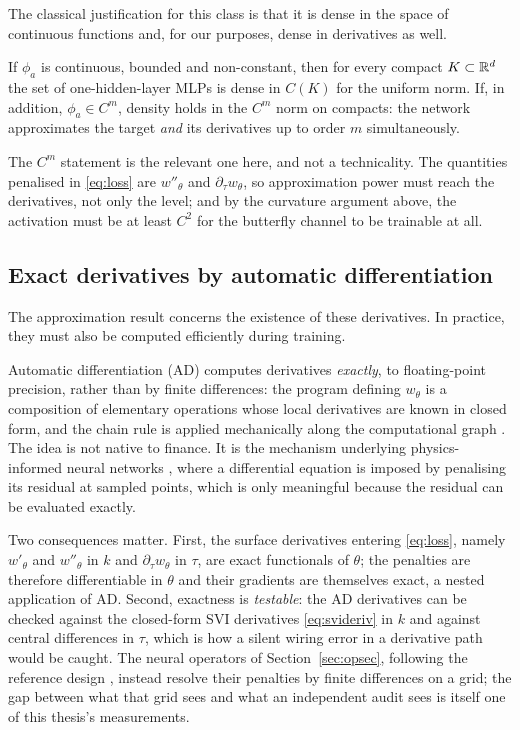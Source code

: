 The classical justification for this class is that it is dense in the space of continuous
functions and, for our purposes, dense in derivatives as well.

\begin{proposition}\label{thm:hornik}
If $\phi_a$ is continuous, bounded and non-constant, then for every compact $K\subset\mathbb{R}^d$ the
set of one-hidden-layer MLPs is dense in $C(K)$ for the uniform norm. If, in addition,
$\phi_a\in C^m$, density holds in the $C^m$ norm on compacts: the network approximates the
target \emph{and} its derivatives up to order $m$ simultaneously.
\end{proposition}

The $C^m$ statement is the relevant one here, and not a technicality. The quantities penalised in
\eqref{eq:loss} are $w''_\theta$ and $\partial_\tau w_\theta$, so approximation power must reach
the derivatives, not only the level; and by the curvature argument above, the activation must be
at least $C^2$ for the butterfly channel to be trainable at all.

\subsection{Exact derivatives by automatic differentiation}

The approximation result concerns the existence of these derivatives. In practice, they must
also be computed efficiently during training.

Automatic differentiation (AD) computes derivatives \emph{exactly}, to floating-point precision,
rather than by finite differences: the program defining $w_\theta$ is a composition of elementary
operations whose local derivatives are known in closed form, and the chain rule is applied
mechanically along the computational graph \cite{baydin2018}. The idea is not native to finance.
It is the mechanism underlying physics-informed neural networks \cite{raissi2019,lagaris1998},
where a differential equation is imposed by penalising its residual at sampled points, which is
only meaningful because the residual can be evaluated exactly.

Two consequences matter. First, the surface derivatives entering \eqref{eq:loss}, namely
$w'_\theta$ and $w''_\theta$ in $k$ and $\partial_\tau w_\theta$ in $\tau$, are exact functionals
of $\theta$; the penalties are therefore differentiable in $\theta$ and their gradients are
themselves exact, a nested application of AD. Second, exactness is \emph{testable}: the AD
derivatives can be checked against the closed-form SVI derivatives \eqref{eq:svideriv} in $k$ and
against central differences in $\tau$, which is how a silent wiring error in a derivative path
would be caught. The neural operators of Section~\ref{sec:opsec}, following the reference design
\cite{wiedemann2025}, instead resolve their penalties by finite differences on a grid; the gap
between what that grid sees and what an independent audit sees is itself one of this thesis's
measurements.

